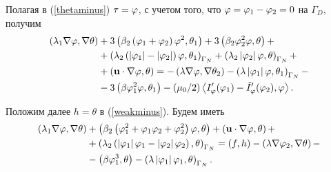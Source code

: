 Полагая в (\ref{thetaminus}) $\tau = \varphi$, с учетом того, что $\varphi = \varphi_1 - \varphi_2 = 0$ на $\Gamma_D$, получим
\begin{equation}
\label{thetaminus1}
    \begin{split}
        \left( \lambda_1 \nabla \varphi, \nabla \theta \right) 
        &+ 3 \left( \beta_2 \left( \varphi_1 + \varphi_2 \right) \varphi^2, \theta_1 \right) 
        + 3 \left( \beta_2 \varphi_2^2 \varphi, \theta \right) + \\
        &+ \left( \lambda_2 \left( 
            \left\vert \varphi_1 \right\vert - \left\vert \varphi_2 \right\vert
         \right) \varphi, \theta_1 \right)_{\Gamma_N}
        + \left( \lambda_2 \left\vert \varphi_2 \right\vert \varphi, \theta \right)_{\Gamma_N} + \\
        &+ \left( \mathbf{u} \cdot \nabla \varphi, \theta \right)
        = - \left( \lambda \nabla \varphi, \nabla \theta_2 \right)
        - \left( \lambda \left\vert \varphi_1 \right\vert \varphi, \theta_1 \right)_{\Gamma_N} - \\
        &- 3 \left( \beta \varphi_1^2 \varphi, \theta_1 \right)
        - (\mu_0 / 2) \left\langle 
            I_\varphi' (\varphi_1) - \tilde I_\varphi' (\varphi_2) , \varphi
         \right\rangle.
    \end{split}
\end{equation}

Положим далее $h = \theta$ в (\ref{weakminus}). Будем иметь
\[
    \begin{split}
        \left( \lambda_1 \nabla \varphi, \nabla \theta \right) 
        &+ \left( \beta_2 
            \left( 
                \varphi_1^2 + \varphi_1 \varphi_2 + \varphi_2^2
             \right) \varphi, \theta
         \right) + \left( \mathbf{u} \cdot \nabla \varphi, \theta \right) + \\
        &+ \left( \lambda_2 
            \left( 
                \left\vert \varphi_1 \right\vert \varphi_1 - \left\vert \varphi_2 \right\vert \varphi_2
             \right), \theta
         \right)_{\Gamma_N}
        = \left( f, h \right) 
        - \left( \lambda \nabla \varphi_2, \nabla \theta \right) - \\
        &- \left( \beta \varphi_1^3, \theta \right) 
        - \left( \lambda \left\vert \varphi_1 \right\vert \varphi_1,\theta \right)_{\Gamma_N}.
    \end{split}
\]


